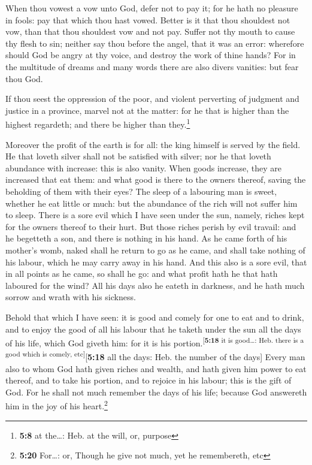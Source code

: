  When thou vowest a vow unto God, defer not to pay it; for
he hath no pleasure in fools: pay that which thou hast vowed.
 Better is it that thou shouldest not vow, than that thou
shouldest vow and not pay.  Suffer not thy mouth to cause
thy flesh to sin; neither say thou before the angel, that it was an
error: wherefore should God be angry at thy voice, and destroy the work
of thine hands?  For in the multitude of dreams and many
words there are also divers vanities: but fear thou God.

 If thou seest the oppression of the poor, and violent
perverting of judgment and justice in a province, marvel not at the
matter: for he that is higher than the highest regardeth; and there be
higher than they.\footnote{\textbf{5:8} at the\ldots: Heb. at the will,
  or, purpose}

 Moreover the profit of the earth is for all: the king
himself is served by the field.  He that loveth silver
shall not be satisfied with silver; nor he that loveth abundance with
increase: this is also vanity.  When goods increase, they
are increased that eat them: and what good is there to the owners
thereof, saving the beholding of them with their eyes? 
The sleep of a labouring man is sweet, whether he eat little or much:
but the abundance of the rich will not suffer him to sleep.
 There is a sore evil which I have seen under the sun,
namely, riches kept for the owners thereof to their hurt.
 But those riches perish by evil travail: and he
begetteth a son, and there is nothing in his hand.  As he
came forth of his mother's womb, naked shall he return to go as he came,
and shall take nothing of his labour, which he may carry away in his
hand.  And this also is a sore evil, that in all points
as he came, so shall he go: and what profit hath he that hath laboured
for the wind?  All his days also he eateth in darkness,
and he hath much sorrow and wrath with his sickness.

 Behold that which I have seen: it is good and comely for
one to eat and to drink, and to enjoy the good of all his labour that he
taketh under the sun all the days of his life, which God giveth him: for
it is his portion.\textsuperscript{{[}\textbf{5:18} it is good\ldots:
Heb. there is a good which is comely, etc{]}}{[}\textbf{5:18} all the
days: Heb. the number of the days{]}  Every man also to
whom God hath given riches and wealth, and hath given him power to eat
thereof, and to take his portion, and to rejoice in his labour; this is
the gift of God.  For he shall not much remember the days
of his life; because God answereth him in the joy of his
heart.\footnote{\textbf{5:20} For\ldots: or, Though he give not much,
  yet he remembereth, etc}

